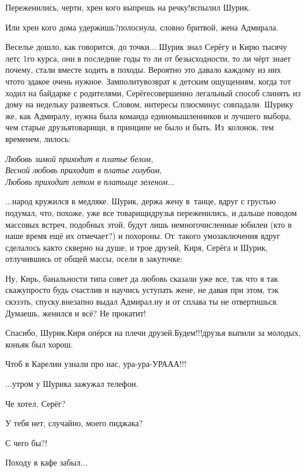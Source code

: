 \diagdash Переженились, черти, хрен кого выпрешь на речку!\mdash вспылил Шурик.

\diagdash Или хрен кого дома удержишь?\mdash полоснула, словно бритвой, жена Адмирала. 

Веселье дошло, как говорится, до точки$\ldots$ Шурик знал Серёгу и Кирю тысячу лет\mdash с 1\sdash го курса, они в последние годы то ли от безысходности, то ли чёрт знает почему, стали вместе ходить в походы. Вероятно это давало каждому из них что\sdash то эдакое очень нужное. Замполиту\mdash возврат к детским ощущениям, когда тот ходил на байдарке с родителями, Серёге\mdash совершенно легальный способ слинять из дому на недельку развеяться. Словом, интересы плюс\sdash минус совпадали. Шурику же, как Адмиралу, нужна была команда единомышленников и лучшего выбора, чем старые друзья\sdash товарищи, в принципе не было и быть. Из~колонок, тем временем, лилось:

\vspace{0.1cm}
\noindent\textit{%
	\hspace*{1.4cm}Любовь зимой приходит в платье белом,\\
	\hspace*{1.4cm}Весной любовь приходит в платье голубом,\\
	\hspace*{1.4cm}Любовь приходит летом в платьице зеленом$\ldots$
}

$\ldots$народ кружился в медляке. Шурик, держа жену в~танце, вдруг с грустью подумал, что, похоже, уже все товарищи\sdash друзья переженились, и дальше поводом массовых встреч, подобных этой, будут лишь немногочисленные юбилеи (кто в наше время ещё их отмечает?) и похороны. От~такого умозаключения вдруг сделалось как\sdash то скверно на душе, и трое друзей, Киря, Серёга и Шурик, отлучившись от общей массы, осели в закуточке:

\diagdash Ну, Кирь, банальности типа совет да любовь сказали уже все, так что я так скажу\mdash просто будь счастлив и научись уступать жене, не давая при этом, тэк скэзэть, спуску.\mdash внезапно выдал Адмирал.\mdash ну и от сплава ты не отвертишься. Думаешь, женился и всё? Не прокатит!

\diagdash Спасибо, Шурик.\mdash Киря опёрся на плечи друзей.\mdash Будем!!!\mdash друзья выпили за молодых, коньяк был хорош.

\diagdash Чтоб в Карелии узнали про нас, ура-ура-УРААА!!!

\vspace{1cm}

$\ldots$утром у Шурика зажужал телефон. 

\diagdash Че хотел, Серёг?

\diagdash У тебя нет, случайно, моего пиджака?

\diagdash С чего бы?!

\diagdash Походу в кафе забыл$\ldots$

\begin{center}
\end{center}
